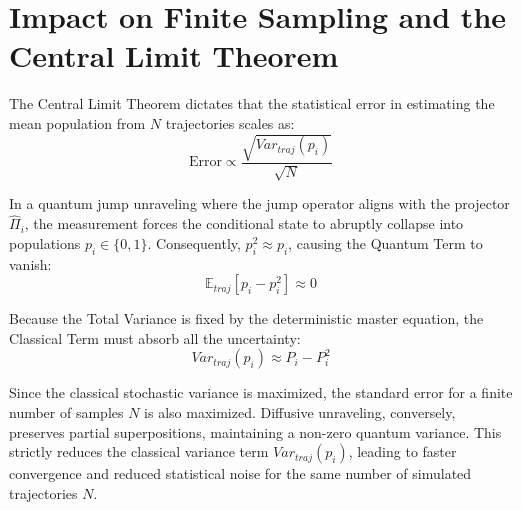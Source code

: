 \documentclass[a4paper,12pt]{article}
\begin{document}
\section{Impact on Finite Sampling and the Central Limit Theorem}

The Central Limit Theorem dictates that the statistical error in estimating the mean population from $N$ trajectories scales as:
\begin{equation}
	\text{Error} \propto \frac{\sqrt{Var_{traj}(p_i)}}{\sqrt{N}}
\end{equation}

In a quantum jump unraveling where the jump operator aligns with the projector $\hat{\Pi}_i$, the measurement forces the conditional state to abruptly collapse into populations $p_i \in \{0, 1\}$. 
Consequently, $p_i^2 \approx p_i$, causing the Quantum Term to vanish:
\begin{equation}
	\mathbb{E}_{traj}[p_i - p_i^2] \approx 0
\end{equation}

Because the Total Variance is fixed by the deterministic master equation, the Classical Term must absorb all the uncertainty:
\begin{equation}
	Var_{traj}(p_i) \approx P_i - P_i^2
\end{equation}

Since the classical stochastic variance is maximized, the standard error for a finite number of samples $N$ is also maximized. Diffusive unraveling, conversely, preserves partial superpositions, maintaining a non-zero quantum variance. This strictly reduces the classical variance term $Var_{traj}(p_i)$, leading to faster convergence and reduced statistical noise for the same number of simulated trajectories $N$.

\newpage
\printbibliography
\end{document}

